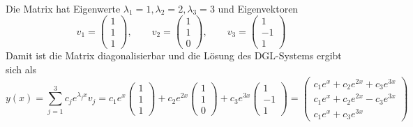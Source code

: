 \documentclass[a4paper]{scrartcl}
\begin{document}
\newpage

\begin{aufgabe}~

	Die Matrix hat Eigenwerte $\lambda_1 = 1, \lambda_2 = 2, \lambda_3 = 3$ und Eigenvektoren
	\[
		v_1 = \begin{pmatrix}
			1 \\ 1 \\ 1
		\end{pmatrix}, \qquad
		v_2 = \begin{pmatrix}
			1 \\ 1 \\ 0
		\end{pmatrix}, \qquad
		v_3 = \begin{pmatrix}
			1 \\ -1 \\ 1
		\end{pmatrix}
	\]
	Damit ist die Matrix diagonalisierbar und die Lösung des DGL-Systems ergibt sich als
	\[
		y(x) 
		= \sum_{j=1}^3 c_j e^{\lambda_j x}v_j
		= c_1 e^x \begin{pmatrix}
			1 \\ 1 \\ 1
		\end{pmatrix} + c_2 e^{2x} \begin{pmatrix}
			1 \\ 1 \\ 0
		\end{pmatrix} + c_3 e^{3x} \begin{pmatrix}
			1 \\ -1 \\ 1
		\end{pmatrix}
		= \begin{pmatrix}
			c_1 e^x + c_2 e^{2x} + c_3 e^{3x} \\
			c_1 e^x + c_2 e^{2x} - c_3 e^{3x} \\
			c_1 e^x + c_3 e^{3x}
		\end{pmatrix}
	\]
\end{aufgabe}
\end{document}
